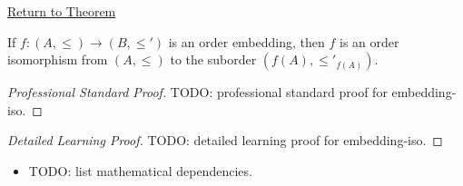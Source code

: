 \newpage
{}
\label{prf:embedding-iso}

\begin{remark*}[Return]
\hyperref[prop:embedding-iso]{Return to Theorem}
\end{remark*}

\begin{proposition*}
If $f : (A, \leq) \to (B, \leq')$ is an order embedding, then $f$ is an
order isomorphism from $(A, \leq)$ to the suborder $(f(A), \leq'_{f(A)})$.
\end{proposition*}

\begin{proof}[Professional Standard Proof]
\LRAProofBodyStart
TODO: professional standard proof for embedding-iso.
\end{proof}

\begin{proof}[Detailed Learning Proof]
\LRAProofBodyStart
TODO: detailed learning proof for embedding-iso.
\end{proof}

\begin{remark*}
\end{remark*}

\begin{dependencies}
\begin{itemize}
  \item TODO: list mathematical dependencies.
\end{itemize}
\end{dependencies}

\clearpage
